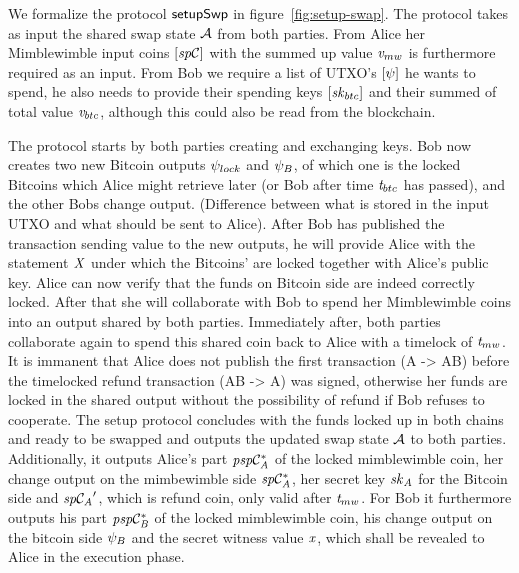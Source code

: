 We formalize the protocol $\mathsf{setupSwp}$ in figure~\ref{fig:setup-swap}.
The protocol takes as input the shared swap state $\mathcal{A}$ from both parties.
From Alice her Mimblewimble input coins $[\mathit{sp}\mathcal{C}]$ with the summed up value $\mathit{v}_{mw}$ is furthermore required as an input.
From Bob we require a list of UTXO's $[\psi]$ he wants to spend, he also needs to provide their spending keys $[\mathit{sk}_{btc}]$ and their summed of total value $\mathit{v}_{btc}$, although this could also be read from the blockchain.

The protocol starts by both parties creating and exchanging keys.
Bob now creates two new Bitcoin outputs $\psi_{lock}$ and $\psi_{B}$, of which one is the locked Bitcoins which Alice might retrieve later (or Bob after time $\mathit{t}_{btc}$ has passed), and the other Bobs change output. (Difference between what is stored in the input UTXO and what should be sent to Alice).
After Bob has published the transaction sending value to the new outputs, he will provide Alice with the statement $\mathit{X}$ under which the Bitcoins' are locked together with Alice's public key.
Alice can now verify that the funds on Bitcoin side are indeed correctly locked.
After that she will collaborate with Bob to spend her Mimblewimble coins into an output shared by both parties.
Immediately after, both parties collaborate again to spend this shared coin back to Alice with a timelock of $\mathit{t}_{mw}$.
It is immanent that Alice does not publish the first transaction (A -> AB) before the timelocked refund transaction (AB -> A) was signed, otherwise her funds are locked in the shared output without the possibility of refund if Bob refuses to cooperate.
The setup protocol concludes with the funds locked up in both chains and ready to be swapped and outputs the updated swap state $\mathcal{A}$ to both parties.
Additionally, it outputs Alice's part $\mathit{psp}\mathcal{C}_{\mathit{A}}^*$ of the locked mimblewimble coin, her change output on the mimbewimble side $\mathit{sp}\mathcal{C}_{\mathit{A}}^*$, her secret key $\mathit{sk}_{\mathit{A}}$ for the Bitcoin side and ${\mathit{sp}\mathcal{C}_{\mathit{A}}}'$, which is refund coin, only valid after $\mathit{t}_{mw}$.
For Bob it furthermore outputs his part $\mathit{psp}\mathcal{C}_{\mathit{B}}^*$ of the locked mimblewimble coin, his change output on the bitcoin side $\psi_{B}$ and the secret witness value $\mathit{x}$, which shall be revealed to Alice in the execution phase.


